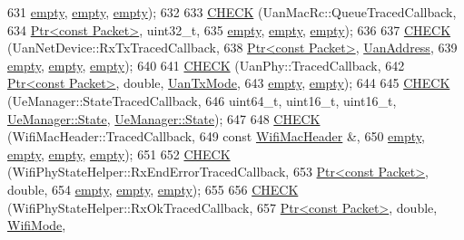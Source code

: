 \begin{DoxyCode}
631          \hyperlink{classns3_1_1empty}{empty}, \hyperlink{classns3_1_1empty}{empty}, \hyperlink{classns3_1_1empty}{empty});
632 
633   \hyperlink{traced-callback-typedef-test-suite_8cc_aa79806eee113005f96d9d3cb1480ce98}{CHECK} (UanMacRc::QueueTracedCallback,
634          \hyperlink{classns3_1_1Ptr}{Ptr<const Packet>}, uint32\_t,
635          \hyperlink{classns3_1_1empty}{empty}, \hyperlink{classns3_1_1empty}{empty}, \hyperlink{classns3_1_1empty}{empty});
636 
637   \hyperlink{traced-callback-typedef-test-suite_8cc_aa79806eee113005f96d9d3cb1480ce98}{CHECK} (UanNetDevice::RxTxTracedCallback,
638          \hyperlink{classns3_1_1Ptr}{Ptr<const Packet>}, \hyperlink{classns3_1_1UanAddress}{UanAddress},
639          \hyperlink{classns3_1_1empty}{empty}, \hyperlink{classns3_1_1empty}{empty}, \hyperlink{classns3_1_1empty}{empty});
640 
641   \hyperlink{traced-callback-typedef-test-suite_8cc_aa79806eee113005f96d9d3cb1480ce98}{CHECK} (UanPhy::TracedCallback,
642          \hyperlink{classns3_1_1Ptr}{Ptr<const Packet>}, \textcolor{keywordtype}{double}, \hyperlink{classns3_1_1UanTxMode}{UanTxMode},
643          \hyperlink{classns3_1_1empty}{empty}, \hyperlink{classns3_1_1empty}{empty});
644 
645   \hyperlink{traced-callback-typedef-test-suite_8cc_aa79806eee113005f96d9d3cb1480ce98}{CHECK} (UeManager::StateTracedCallback,
646          uint64\_t, uint16\_t, uint16\_t, \hyperlink{classns3_1_1UeManager_a2f4085fdd18d7125c27da44a5b8b6808}{UeManager::State}, 
      \hyperlink{classns3_1_1UeManager_a2f4085fdd18d7125c27da44a5b8b6808}{UeManager::State});
647 
648   \hyperlink{traced-callback-typedef-test-suite_8cc_aa79806eee113005f96d9d3cb1480ce98}{CHECK} (WifiMacHeader::TracedCallback,
649          \textcolor{keyword}{const} \hyperlink{classns3_1_1WifiMacHeader}{WifiMacHeader} &,
650          \hyperlink{classns3_1_1empty}{empty}, \hyperlink{classns3_1_1empty}{empty}, \hyperlink{classns3_1_1empty}{empty}, \hyperlink{classns3_1_1empty}{empty});
651 
652   \hyperlink{traced-callback-typedef-test-suite_8cc_aa79806eee113005f96d9d3cb1480ce98}{CHECK} (WifiPhyStateHelper::RxEndErrorTracedCallback,
653          \hyperlink{classns3_1_1Ptr}{Ptr<const Packet>}, \textcolor{keywordtype}{double},
654          \hyperlink{classns3_1_1empty}{empty}, \hyperlink{classns3_1_1empty}{empty}, \hyperlink{classns3_1_1empty}{empty});
655 
656   \hyperlink{traced-callback-typedef-test-suite_8cc_aa79806eee113005f96d9d3cb1480ce98}{CHECK} (WifiPhyStateHelper::RxOkTracedCallback,
657          \hyperlink{classns3_1_1Ptr}{Ptr<const Packet>}, \textcolor{keywordtype}{double}, \hyperlink{classns3_1_1WifiMode}{WifiMode}, 

\end{DoxyCode}

